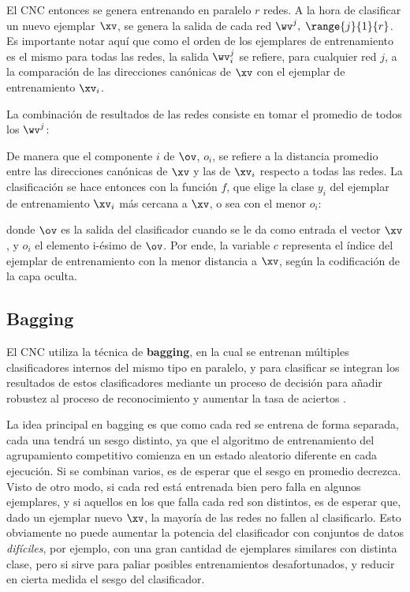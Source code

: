 El CNC entonces se genera entrenando en paralelo $r$ redes. A la hora de clasificar un nuevo ejemplar $\xv$, se genera la salida de cada red $\wv^j, \; \range{j}{1}{r}$. Es importante notar aquí que como el orden de los ejemplares de entrenamiento es el mismo para todas las redes, la salida $\wv_i^j$ se refiere, para cualquier red $j$, a la comparación de las direcciones canónicas de $\xv$ con el ejemplar de entrenamiento $\xv_i$. 


La combinación de resultados de las redes consiste en tomar el promedio de todos los $\wv^j$:


De manera que el componente $i$ de $\ov$, $o_i$, se refiere a la distancia promedio entre las direcciones canónicas de $\xv$ y las de $\xv_i$ respecto a todas las redes. La clasificación se hace entonces con la función $f$, que elige la clase $y_i$ del ejemplar de entrenamiento $\xv_i$ más cercana a $\xv$, o sea con el menor $o_i$:


donde $\ov$ es la salida del clasificador cuando se le da como entrada el vector $\xv$, y $o_i$ el elemento i-ésimo de $\ov$. Por ende, la variable $c$ representa el índice del ejemplar de entrenamiento con la menor distancia a $\xv$, según la codificación de la capa oculta.


\subsection{Bagging}

El CNC utiliza la técnica de \textbf{bagging}, en la cual se entrenan múltiples clasificadores internos del mismo tipo en paralelo, y para clasificar se integran los resultados de estos clasificadores mediante un proceso de decisión para añadir robustez al proceso de reconocimiento y aumentar la tasa de aciertos \cite{maclin2011}. 

La idea principal en bagging es que como cada red se entrena de forma separada, cada una tendrá un sesgo distinto, ya que el algoritmo de entrenamiento del agrupamiento competitivo comienza en un estado aleatorio diferente en cada ejecución. Si se combinan varios, es de esperar que el sesgo en promedio decrezca. Visto de otro modo, si cada red está entrenada bien pero falla en algunos ejemplares, y si aquellos en los que falla cada red son distintos, es de esperar que, dado un ejemplar nuevo $\xv$, la mayoría de las redes no fallen al clasificarlo. Esto obviamente no puede aumentar la potencia del clasificador con conjuntos de datos \textit{difíciles}, por ejemplo, con una gran cantidad de ejemplares similares con distinta clase, pero si sirve para paliar posibles entrenamientos desafortunados, y reducir en cierta medida el sesgo del clasificador.

